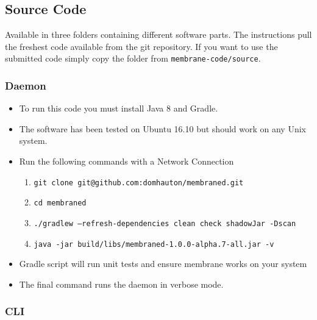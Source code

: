 \documentclass[11pt, a4paper, twoside]{report}
\def\code#1{\texttt{#1}}
\begin{document}
\subsection{Source Code}

Available in three folders containing different software parts. The instructions pull the freshest code available from the git repository. If you want to use the submitted code simply copy the folder from \code{membrane-code/source}.

\subsubsection{Daemon}

\begin{itemize}
 \item To run this code you must install Java 8 and Gradle.
 \item The software has been tested on Ubuntu 16.10 but should work on any Unix system.
 \item Run the following commands with a Network Connection
 \begin{enumerate}
  \item \code{git clone git@github.com:domhauton/membraned.git}
  \item \code{cd membraned}
  \item \code{./gradlew --refresh-dependencies clean check shadowJar -Dscan}
  \item \code{java -jar build/libs/membraned-1.0.0-alpha.7-all.jar -v}
 \end{enumerate}
 \item Gradle script will run unit tests and ensure membrane works on your system
 \item The final command runs the daemon in verbose mode.
\end{itemize}

\subsubsection{CLI}
\end{document}
